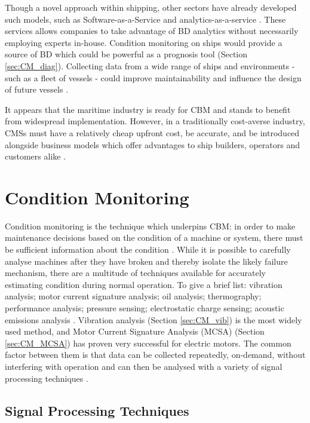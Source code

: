 Though a novel approach within shipping, other sectors have already developed such models, such as Software-as-a-Service and analytics-as-a-service \cite{CBM_norway_bd}.
These services allows companies to take advantage of BD analytics without necessarily employing experts in-house.
Condition monitoring on ships would provide a source of BD which could be powerful as a prognosis tool (Section \ref{sec:CM_diag}).
Collecting data from a wide range of ships and environments - such as a fleet of vessels - could improve maintainability and influence the design of future vessels \cite{CBM_norway_bd}.\par
It appears that the maritime industry is ready for CBM and stands to benefit from widespread implementation.
However, in a traditionally cost-averse industry, CMSs must have a relatively cheap upfront cost, be accurate, and be introduced alongside business models which offer advantages to ship builders, operators and customers alike \cite{CBM_shipping_opportunity}\cite{CBM_norway_bd}.

\section{Condition Monitoring}\label{sec:CM}

Condition monitoring is the technique which underpins CBM: in order to make maintenance decisions based on the condition of a machine or system, there must be sufficient information about the condition \cite{CM_randall}.
While it is possible to carefully analyse machines after they have broken and thereby isolate the likely failure mechanism, there are a multitude of techniques available for accurately estimating condition during normal operation.
To give a brief list: vibration analysis; motor current signature analysis; oil analysis; thermography; performance analysis; pressure sensing; electrostatic charge sensing; acoustic emissions analysis \cite{CBM_overview}\cite{CM_randall}\cite{CBM_wind_signal}.
Vibration analysis (Section \ref{sec:CM_vib}) is the most widely used method, and Motor Current Signature Analysis (MCSA) (Section \ref{sec:CM_MCSA}) has proven very successful for electric motors.
The common factor between them is that data can be collected repeatedly, on-demand, without interfering with operation and can then be analysed with a variety of signal processing techniques \cite{CM_randall}.


\subsection{Signal Processing Techniques}

